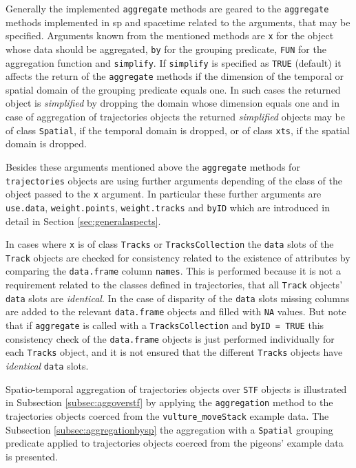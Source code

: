 \documentclass[12pt, oneside, a4paper]{scrbook}
\newcommand{\pkg}[1]{{\normalfont\fontseries{b}\selectfont #1}}
\let\code=\texttt
\begin{document}
Generally the implemented \code{aggregate} methods are geared to the \code{aggregate} methods implemented in \pkg{sp} and \pkg{spacetime} related to the arguments, that may be specified.
Arguments known from the mentioned methods are \code{x} for the object whose data should be aggregated, \code{by} for the grouping predicate, \code{FUN} for the aggregation function and \code{simplify}.
If \code{simplify} is specified as \code{TRUE} (default) it affects the return of the \code{aggregate} methods if the dimension of the temporal or spatial domain of the grouping predicate equals one.
In such cases the returned object is \textit{simplified} by dropping the domain whose dimension equals one and in case of aggregation of \pkg{trajectories} objects the returned \textit{simplified} objects may be of class \code{Spatial}, if the temporal domain is dropped, or of class \code{xts}, if the spatial domain is dropped.
\par\medskip

Besides these arguments mentioned above the \code{aggregate} methods for \code{trajectories} objects are using further arguments depending of the class of the object passed to the \code{x} argument. In particular these further arguments are \code{use.data}, \code{weight.points}, \code{weight.tracks} and \code{byID} which are introduced in detail in Section \ref{sec:generalaspects}.
\par\medskip

In cases where \code{x} is of class \code{Tracks} or \code{TracksCollection} the \code{data} slots of the \code{Track} objects are checked for consistency related to the existence of attributes by comparing the \code{data.frame} column \code{names}. This is performed because it is not a requirement related to the classes defined in \pkg{trajectories}, that all \code{Track} objects' \code{data} slots are \textit{identical}.
In the case of disparity of the \code{data} slots missing columns are added to the relevant \code{data.frame} objects and filled with \code{NA} values. 
But note that if \code{aggregate} is called with a \code{TracksCollection} and \code{byID = TRUE} this consistency check of the \code{data.frame} objects is just performed individually for each \code{Tracks} object, and it is not ensured that the different \code{Tracks} objects have \textit{identical} \code{data} slots.
\par\medskip

Spatio-temporal aggregation of \pkg{trajectories} objects over \code{STF} objects is illustrated in Subsection \ref{subsec:aggoverstf} by applying the \code{aggregation} method to the \pkg{trajectories} objects coerced from the \code{vulture\_moveStack} example data.
The Subsection \ref{subsec:aggregationbysp} the aggregation with a \code{Spatial} grouping predicate applied to \pkg{trajectories} objects coerced from the pigeons' example data is presented.
\par\medskip
\end{document}
